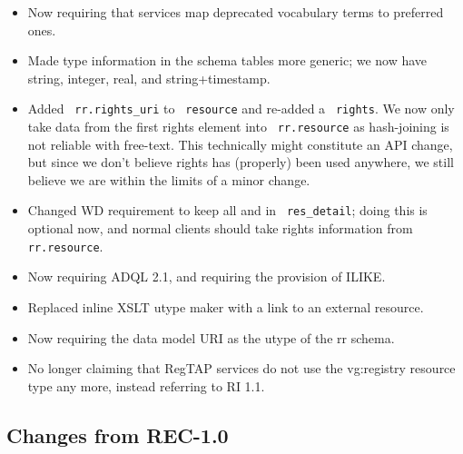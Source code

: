\documentclass[11pt,a4paper]{ivoa}
\newcommand{\rtent}[1]{\texttt{\color{rtcolor} #1}}
\begin{document}
\begin{itemize}
\item Now requiring that services map deprecated vocabulary terms to
preferred ones.
\item Made type information in the schema tables more generic; we now
have string, integer, real, and string+timestamp.
\item Added \rtent{rr.rights\_uri} to \rtent{resource} and re-added a
\rtent{rights}.  We now only take data from the first rights element
into \rtent{rr.resource} as hash-joining is not reliable with free-text.
This technically might constitute an API change, but since we don't
believe rights has (properly) been used anywhere, we still believe we are
within the limits of a minor change.
\item  Changed WD requirement to keep all  and
 in \rtent{res\_detail}; doing this is optional now,
and normal clients should take rights information from
\rtent{rr.resource}.
\item Now requiring ADQL 2.1, and requiring the provision of ILIKE.
\item Replaced inline XSLT utype maker with a link to an external
resource.
\item Now requiring the data model URI as the utype of the rr schema.
\item No longer claiming that RegTAP services do not use the vg:registry
resource type any more, instead referring to RI 1.1.
\end{itemize}

\subsection{Changes from REC-1.0}
\end{document}
